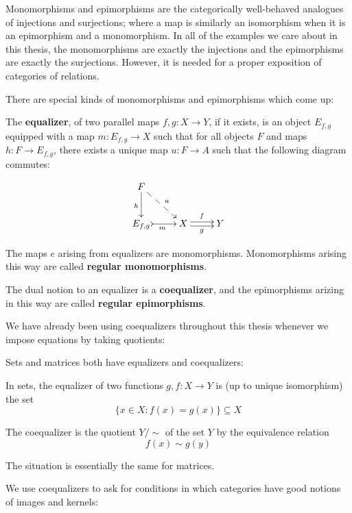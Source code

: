 Monomorphisms and epimorphisms are the categorically well-behaved analogues of injections and surjections; where a map is similarly an isomorphism when it is an epimorphism and a monomorphism.  In all of the examples we care about in this thesis, the monomorphisms are exactly the injections and the epimorphisms are exactly the surjections.  However, it is needed for a proper exposition of categories of relations.

There are  special kinds of monomorphisms and epimorphisms which come up:



\begin{definition}
The {\bf equalizer}, of two parallel maps $f,g:X\to Y$, if it exists, is an object $E_{f,g}$ equipped with a map $m:E_{f,g}\to X$ such that for all objects $F$ and maps $h:F\to E_{f,g}$, there exists a unique map $u:F\to A$ such that the following diagram commutes:

$$
\xymatrix{
    F \ar@{-->}[dr]^{u} \ar[d]_h
  \\ E_{f,g} \ar@{>->}[r]_m
    & X \ar@<-.5ex>[r]_g \ar@<.5ex>[r]^f
    & Y
}
$$


The maps $e$ arising from equalizers are monomorphisms.  Monomorphisms arising this way are called {\bf regular monomorphisms}.

The dual notion to an equalizer is a {\bf coequalizer}, and the epimorphisms arizing in this way are called {\bf regular epimorphisms}.
\end{definition}


We have already been using coequalizers throughout this thesis whenever we impose equations by taking quotients:


\begin{example}
Sets and matrices both have equalizers and coequalizers:

In sets, the equalizer of two functions $g,f:X\to Y$ is (up to unique isomorphism) the set 
$$\{x \in X:f(x)=g(x)\} \subseteq X$$

The coequalizer is the quotient $Y/\sim$   of the set $Y$ by the equivalence relation 
$$f(x)\sim g(y)$$

The situation is essentially the same for matrices.
\end{example}


We  use coequalizers to ask for conditions in which categories have good notions of images and kernels:


